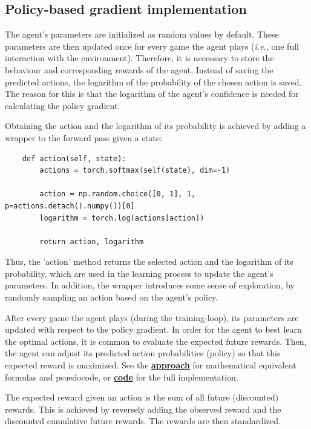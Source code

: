 \documentclass{article}
\let\oldhyperlink\hyperlink
\renewcommand{\hyperlink}[2]{\oldhyperlink{#1}{\textbf{#2}}}
\renewenvironment{leftbar}[1][\hsize]{
    \def\FrameCommand{{\color{barcolor}\vrule width 0.5pt \hspace{10pt}}}
    \MakeFramed{\hsize#1 \advance\hsize-\width \FrameRestore}
}{\endMakeFramed}
\begin{document}
\subsection*{Policy-based gradient implementation}
\begin{leftbar}

    The agent's parameters are initialized as random values by default. These parameters are then updated once for every game the agent plays (\textit{i.e.}, one full interaction with the environment). Therefore, it is necessary to store the behaviour and corresponding rewards of the agent. Instead of saving the predicted actions, the logarithm of the probability of the chosen action is saved. The reason for this is that the logarithm of the agent's confidence is needed for calculating the policy gradient.

    Obtaining the action and the logarithm of its probability is achieved by adding a wrapper to the forward pass given a state:

    \begin{lstlisting}
    def action(self, state):
        actions = torch.softmax(self(state), dim=-1)

        action = np.random.choice([0, 1], 1, p=actions.detach().numpy())[0]
        logarithm = torch.log(actions[action])

        return action, logarithm
    \end{lstlisting}

    Thus, the 'action' method returns the selected action and the logarithm of its probability, which are used in the learning process to update the agent's parameters. In addition, the wrapper introduces some sense of exploration, by randomly sampling an action based on the agent's policy.

    After every game the agent plays (during the training-loop), its parameters are updated with respect to the policy gradient. In order for the agent to best learn the optimal actions, it is common to evaluate the expected future rewards. Then, the agent can adjust its predicted action probabilities (policy) so that this expected reward is maximized. See the \hyperlink{sec:policy-based-approach}{approach} for mathematical equivalent formulas and psuedocode, or \hyperlink{sec:code}{code} for the full implementation.

    The expected reward given an action is the sum of all future (discounted) rewards. This is achieved by reversely adding the observed reward and the discounted cumulative future rewards. The rewards are then standardized.


\end{leftbar}
\end{document}
